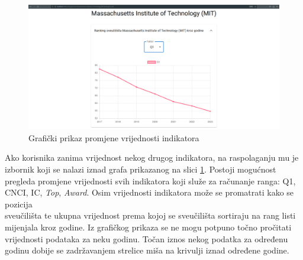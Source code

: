\documentclass[times, utf8, zavrsni]{fer}
\begin{document}
\begin{figure}[htb]
    \centering
       \includegraphics[scale=0.17]{uni1.png} 
       \caption{Grafički prikaz promjene vrijednosti indikatora}
       \label{fig:unipage1}
       \end{figure}
       
Ako korisnika zanima vrijednost nekog drugog indikatora, na raspolaganju mu je izbornik 
koji se nalazi iznad grafa prikazanog na slici \ref{fig:unipage1}. Postoji mogućnost pregleda promjene vrijednosti svih indikatora koji služe za računanje ranga: Q1, CNCI, IC, \emph{Top}, \emph{Award}. 
Osim vrijednosti indikatora može se promatrati kako se pozicija \\ sveučilišta te ukupna vrijednost  prema kojoj se sveučilišta 
sortiraju na rang listi mijenjala kroz godine. Iz grafičkog prikaza se ne mogu potpuno točno pročitati vrijednosti podataka za neku godinu. Točan iznos 
nekog podatka za određenu godinu dobije se zadržavanjem strelice miša na krivulji iznad određene godine.
\end{document}
